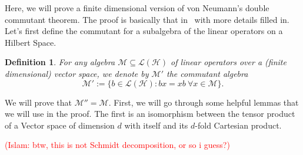 \documentclass[12pt]{article}
\theoremstyle{plain}
\newtheorem{definition}[theorem]{Definition}
\newcommand{\IslamNote}[1]{\textcolor{red}{(Islam: #1)}}
\newcommand{\IslamNote}[1]{}
\begin{document}

Here, we will prove a finite dimensional version of von Neumann's double commutant theorem. The proof is basically that in~\cite{jones15} with more details filled in. Let's first define the commutant for a subalgebra of the linear operators on a Hilbert Space.
\begin{definition}
\label{defn:commutant}
    For any algebra $\mathcal{M} \subseteq \mathcal{L}(\mathcal{H})$ of linear operators over a (finite dimensional) vector space, we denote by $\mathcal{M}'$ the \emph{commutant} algebra 
    \[ \mathcal{M}' := \{ b \in \mathcal{L}(\mathcal{H}) : bx = xb \: \forall x \in \mathcal{M}\}.\]
\end{definition}

We will prove that $\mathcal{M}'' = \mathcal{M}$. First, we will go through some helpful lemmas that we will use in the proof. The first is an isomorphism between the tensor product of a Vector space of dimension $d$ with itself and its $d$-fold Cartesian product.

\IslamNote{btw, this is not Schmidt decomposition, or so i guess?}
\end{document}

